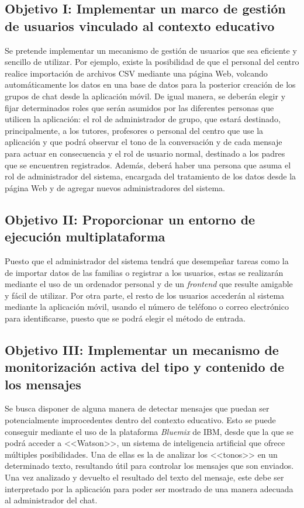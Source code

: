 \subsection{Objetivo I: Implementar un marco de gestión de usuarios vinculado al contexto educativo}
Se pretende implementar un mecanismo de gestión de usuarios que sea eficiente y sencillo de utilizar. Por ejemplo, existe la posibilidad de que el personal del centro realice importación de archivos \acs{CSV} mediante una página Web, volcando automáticamente los datos en una base de datos para la posterior creación de los grupos de chat desde la aplicación móvil. De igual manera, se deberán elegir y fijar determinados roles que serán asumidos por las diferentes personas que utilicen la aplicación: el rol de administrador de grupo, que estará destinado, principalmente, a los tutores, profesores o personal del centro que use la aplicación y que podrá observar el tono de la conversación y de cada mensaje para actuar en consecuencia y el rol de usuario normal, destinado a los padres que se encuentren registrados. Además, deberá haber una persona que asuma el rol de administrador del sistema, encargada del tratamiento de los datos desde la página Web y de agregar nuevos administradores del sistema.

\subsection{Objetivo II: Proporcionar un entorno de ejecución multiplataforma}
Puesto que el administrador del sistema tendrá que desempeñar tareas como la de importar datos de las familias o registrar a los usuarios, estas se realizarán mediante el uso de un ordenador personal y de un \textit{frontend} que resulte amigable y fácil de utilizar. Por otra parte, el resto de los usuarios accederán al sistema mediante la aplicación móvil, usando el número de teléfono o correo electrónico para identificarse, puesto que se podrá elegir el método de entrada.

\subsection{Objetivo III: Implementar un mecanismo de monitorización activa del tipo y contenido de los mensajes}
Se busca disponer de alguna manera de detectar mensajes que puedan ser potencialmente improcedentes dentro del contexto educativo. Esto se puede conseguir mediante el uso de la plataforma \textit{Bluemix} de IBM, desde que la que se podrá acceder a <<Watson>>, un sistema de inteligencia artificial que ofrece múltiples posibilidades. Una de ellas es la de analizar los <<tonos>> en un determinado texto, resultando útil para controlar los mensajes que son enviados. Una vez analizado y devuelto el resultado del texto del mensaje, este debe ser interpretado por la aplicación para poder ser mostrado de una manera adecuada al administrador del chat.

